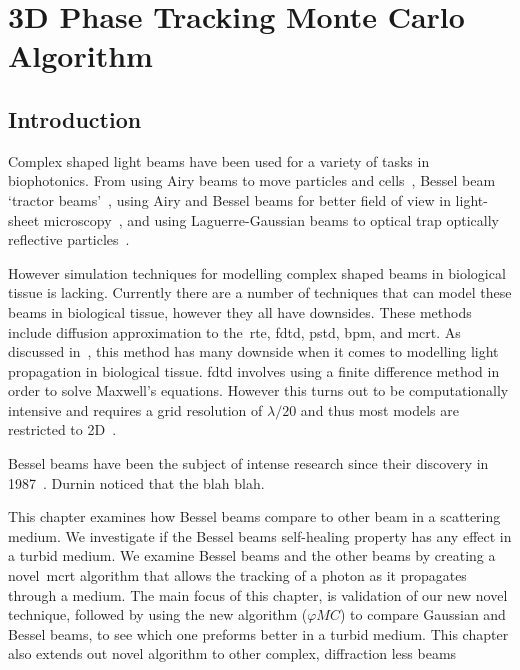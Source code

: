 \chapter{3D Phase Tracking Monte Carlo Algorithm}\label{sec:phase}

\section{Introduction}\label{sec:besintro}


Complex shaped light beams have been used for a variety of tasks in biophotonics.
From using Airy beams to move particles and cells~\cite{baumgartl2008optically}, Bessel beam `tractor beams'~\cite{ruffner2012optical}, using Airy and Bessel beams for better field of view in light-sheet microscopy~\cite{vettenburg2014light}, and using Laguerre-Gaussian beams to optical trap optically reflective particles~\cite{simpson1996optical}.


However simulation techniques for modelling complex shaped beams in biological tissue is lacking.
Currently there are a number of techniques that can model these beams in biological tissue, however they all have downsides.
These methods include diffusion approximation to the~\gls*{rte}, \gls*{fdtd}, \gls*{pstd}, \gls*{bpm}, and \gls*{mcrt}.
As discussed in~, this method has many downside when it comes to modelling light propagation in biological tissue.
\gls{fdtd} involves using a finite difference method in order to solve Maxwell's equations.
However this turns out to be computationally intensive and requires a grid resolution of $\lambda/20$ and thus most models are restricted to 2D~\cite{glaser2016fractal,elmaklizi2015penetration}. 


Bessel beams have been the subject of intense research since their discovery in 1987~\cite{durnin1987diffraction,durnin1987exact}. Durnin noticed that the blah blah.

This chapter examines how Bessel beams compare to other beam in a scattering medium. 
We investigate if the Bessel beams self-healing property has any effect in a turbid medium.{}
We examine Bessel beams and the other beams by creating a novel~\gls*{mcrt} algorithm that allows the tracking of a photon as it propagates through a medium. 
The main focus of this chapter, is validation of our new novel technique, followed by using the new algorithm ($\varphi MC$) to compare Gaussian and Bessel beams, to see which one preforms better in a turbid medium. 
This chapter also extends out novel algorithm to other complex, diffraction less beams


